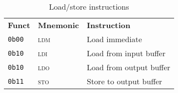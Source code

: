 \begin{table}[h]
    \centering
    \begin{tabular}{|l l l|}
        \hline
        \textbf{Funct} & \textbf{Mnemonic} & \textbf{Instruction} \\
        \texttt{0b00} & \textsc{ldm} & Load immediate \\
        \texttt{0b10} & \textsc{ldi} & Load from input buffer \\
        \texttt{0b10} & \textsc{ldo} & Load from output buffer \\
        \texttt{0b11} & \textsc{sto} & Store to output buffer \\
        \hline
    \end{tabular}

    \caption{Load/store instructions}
    \label{tab:ls_instrs}
\end{table}